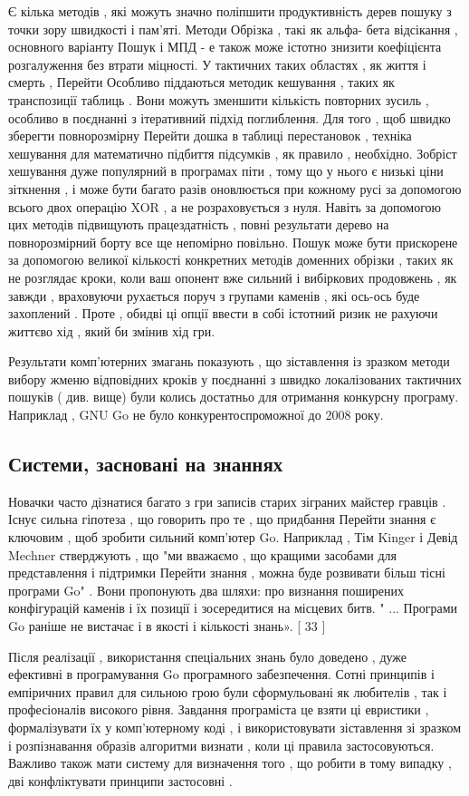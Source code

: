 Є кілька методів , які можуть значно поліпшити продуктивність дерев пошуку з точки зору швидкості і пам'яті. Методи Обрізка , такі як альфа- бета відсікання , основного варіанту Пошук і МПД - е також може істотно знизити коефіцієнта розгалуження без втрати міцності. У тактичних таких областях , як життя і смерть , Перейти Особливо піддаються методик кешування , таких як транспозиції таблиць . Вони можуть зменшити кількість повторних зусиль , особливо в поєднанні з ітеративний підхід поглиблення. Для того , щоб швидко зберегти повнорозмірну Перейти дошка в таблиці перестановок , техніка хешування для математично підбиття підсумків , як правило , необхідно. Зобріст хешування дуже популярний в програмах піти , тому що у нього є низькі ціни зіткнення , і може бути багато разів оновлюється при кожному русі за допомогою всього двох операцію XOR , а не розраховується з нуля. Навіть за допомогою цих методів підвищують працездатність , повні результати дерево на повнорозмірний борту все ще непомірно повільно. Пошук може бути прискорене за допомогою великої кількості конкретних методів доменних обрізки , таких як не розглядає кроки, коли ваш опонент вже сильний і вибіркових продовжень , як завжди , враховуючи рухається поруч з групами каменів , які ось-ось буде захоплений . Проте , обидві ці опції ввести в собі істотний ризик не рахуючи життєво хід , який би змінив хід гри.

Результати комп'ютерних змагань показують , що зіставлення із зразком методи вибору жменю відповідних кроків у поєднанні з швидко локалізованих тактичних пошуків ( див. вище) були колись достатньо для отримання конкурсну програму. Наприклад , GNU Go не було конкурентоспроможної до 2008 року.

\subsection{Системи, засновані на знаннях}
Новачки часто дізнатися багато з гри записів старих зіграних майстер гравців . Існує сильна гіпотеза , що говорить про те , що придбання Перейти знання є ключовим , щоб зробити сильний комп'ютер Go. Наприклад , Тім Kinger і Девід Mechner стверджують , що "ми вважаємо , що кращими засобами для представлення і підтримки Перейти знання , можна буде розвивати більш тісні програми Go" . Вони пропонують два шляхи: про визнання поширених конфігурацій каменів і їх позиції і зосередитися на місцевих битв. " ... Програми Go раніше не вистачає і в якості і кількості знань». [ 33 ]

Після реалізації , використання спеціальних знань було доведено , дуже ефективні в програмування Go програмного забезпечення. Сотні принципів і емпіричних правил для сильною грою були сформульовані як любителів , так і професіоналів високого рівня. Завдання програміста це взяти ці евристики , формалізувати їх у комп'ютерному коді , і використовувати зіставлення зі зразком і розпізнавання образів алгоритми визнати , коли ці правила застосовуються. Важливо також мати систему для визначення того , що робити в тому випадку , дві конфліктувати принципи застосовні .

